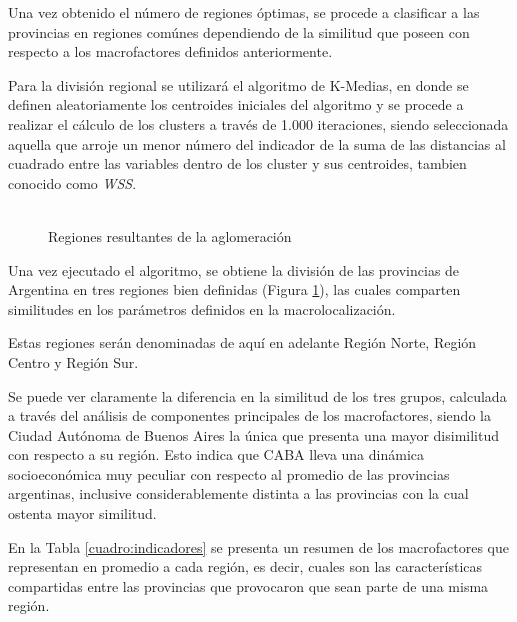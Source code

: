 \documentclass[12pt,a4paper]{article}
\begin{document}
Una vez obtenido el número de regiones óptimas, se procede a clasificar a las provincias en regiones comúnes dependiendo de la similitud que poseen con respecto a los macrofactores definidos anteriormente.

Para la división regional se utilizará el algoritmo de K-Medias, en donde se definen aleatoriamente los centroides iniciales del algoritmo y se procede a realizar el cálculo de los clusters a través de 1.000 iteraciones, siendo seleccionada aquella  que arroje un menor número del indicador de la suma de las distancias al cuadrado entre las variables dentro de  los cluster y sus centroides, tambien conocido como \textit{WSS}.

\begin{figure}[htbp!]
\begin{center}
\caption{\\Regiones resultantes de la aglomeración}

\label{figure:reg_resultantes}
\end{center}
\end{figure}

Una vez ejecutado el algoritmo, se obtiene la división de las provincias de Argentina en tres regiones bien definidas (Figura \ref{figure:reg_resultantes}), las cuales comparten similitudes en los parámetros definidos en la macrolocalización.

Estas regiones serán denominadas de aquí en adelante Región Norte, Región Centro y Región Sur.

Se puede ver claramente la diferencia en la similitud de los tres grupos, calculada a través del análisis de componentes principales de los macrofactores, siendo la Ciudad Autónoma de Buenos Aires la única que presenta una mayor disimilitud con respecto a su región.
Esto indica que CABA  lleva una dinámica socioeconómica muy peculiar con respecto al promedio de las provincias argentinas, inclusive considerablemente distinta a las provincias con la cual ostenta mayor similitud.

En la Tabla \ref{cuadro:indicadores} se presenta un resumen de los macrofactores que representan en promedio a cada región, es decir, cuales son las características compartidas entre las provincias que provocaron que sean parte de una misma región.
\end{document}
